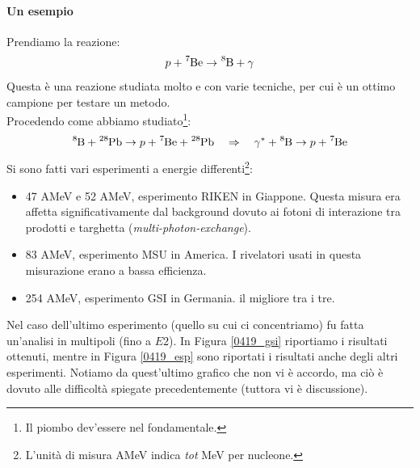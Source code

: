 \paragraph{Un esempio} Prendiamo la reazione:
$$p+\ce{^7Be} \to \ce{^8B}+\gamma$$
Questa è una reazione studiata molto e con varie tecniche, per cui è un ottimo campione per testare un metodo.\\
Procedendo come abbiamo studiato\footnote{Il piombo dev'essere nel fondamentale.}:%
$$\ce{^8B} + \ce{^{28}Pb} \to p +  \ce{^7Be} + \ce{^{28}Pb} \quad \Rightarrow \quad \gamma^* + \ce{^8B} \to p+ \ce{^7Be}$$
Si sono fatti vari esperimenti a energie differenti\footnote{L'unità di misura AMeV indica \textit{tot} MeV per nucleone.}:
\begin{itemize}
	\item 47 AMeV e 52 AMeV, esperimento RIKEN in Giappone. Questa misura era affetta significativamente dal background dovuto ai fotoni di interazione tra prodotti e targhetta (\textit{multi-photon-exchange}).
	\item 83 AMeV, esperimento MSU in America. I rivelatori usati in questa misurazione erano a bassa efficienza.
	\item 254 AMeV, esperimento GSI in Germania.  il migliore tra i tre.
\end{itemize}
\noindent Nel caso dell'ultimo esperimento (quello su cui ci concentriamo) fu fatta un'analisi in multipoli (fino a $E2$). In Figura \ref{0419_gsi} riportiamo i risultati ottenuti, mentre in Figura \ref{0419_esp} sono riportati i risultati anche degli altri esperimenti. Notiamo da quest'ultimo grafico che non vi è accordo, ma ciò è dovuto alle difficoltà spiegate precedentemente (tuttora vi è discussione).

